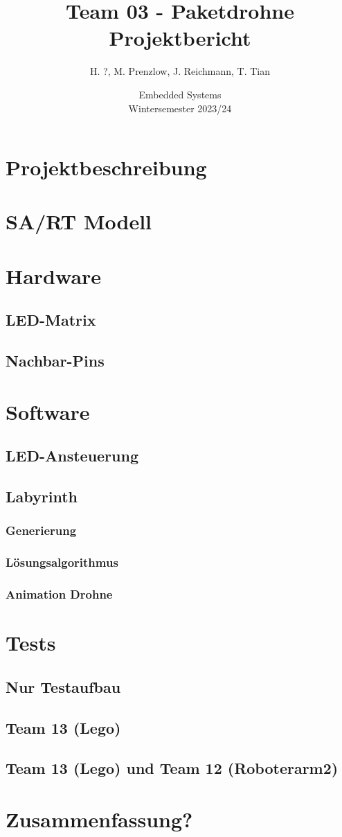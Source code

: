 \documentclass[a4paper,11pt,oneside]{article}
\title{Team 03 - Paketdrohne \\ \textbf{Projektbericht}}
\author{H. ?, M. Prenzlow, J. Reichmann, T. Tian}
\date{Embedded Systems \\ Wintersemester 2023/24}
\begin{document}
\pagestyle{fancy}
\maketitle
\newpage

\tableofcontents
\newpage

\section{Projektbeschreibung}

\section{SA/RT Modell}

\section{Hardware}
\subsection{LED-Matrix}
\subsection{Nachbar-Pins}

\section{Software}
\subsection{LED-Ansteuerung}
\subsection{Labyrinth}
\subsubsection{Generierung}
\subsubsection{Lösungsalgorithmus}
\subsubsection{Animation Drohne}

\section{Tests}
\subsection{Nur Testaufbau}
\subsection{Team 13 (Lego)}
\subsection{Team 13 (Lego) und Team 12 (Roboterarm2)}

\section{Zusammenfassung?}
\end{document}
